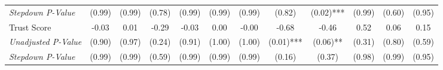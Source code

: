 \begin{tabular}{l c c c c c c c c c c c}
\quad \textit{Stepdown P-Value} & (0.99) & (0.99) & (0.78) & (0.99) & (0.99) & (0.99) & (0.82) & (0.02)*** & (0.99) & (0.60) & (0.95) \\
Trust Score & -0.03 & 0.01 & -0.29 & -0.03 & 0.00 & -0.00 & -0.68 & -0.46 & 0.52 & 0.06 & 0.15 \\
\quad \textit{Unadjusted P-Value} & (0.90) & (0.97) & (0.24) & (0.91) & (1.00) & (1.00) & (0.01)*** & (0.06)** & (0.31) & (0.80) & (0.59) \\
\quad \textit{Stepdown P-Value} & (0.99) & (0.99) & (0.59) & (0.99) & (0.99) & (0.99) & (0.16) & (0.37) & (0.98) & (0.99) & (0.95) \\
\bottomrule
\end{tabular}
